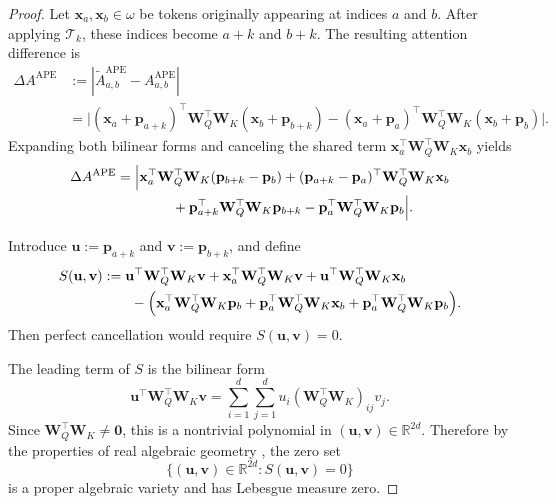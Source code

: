 \begin{proof}
Let $\mathbf{x}_a,\mathbf{x}_b \in \omega$ be tokens originally appearing at indices $a$ and $b$. After applying $\mathcal{T}_k$, these indices become $a+k$ and $b+k$. The resulting attention difference is
\begin{align}
\Delta A^{\mathrm{APE}}
&:=
\left|
\widetilde{A}_{a,b}^{\mathrm{APE}} - A_{a,b}^{\mathrm{APE}}
\right| \\
&=
\Big|
(\mathbf{x}_a+\mathbf{p}_{a+k})^\top \mathbf{W}_Q^\top \mathbf{W}_K (\mathbf{x}_b+\mathbf{p}_{b+k})
-
(\mathbf{x}_a+\mathbf{p}_a)^\top \mathbf{W}_Q^\top \mathbf{W}_K (\mathbf{x}_b+\mathbf{p}_b)
\Big|.
\end{align}
Expanding both bilinear forms and canceling the shared term $\mathbf{x}_a^\top \mathbf{W}_Q^\top \mathbf{W}_K \mathbf{x}_b$ yields
\begin{align}
\Delta A^{\mathrm{APE}}
&=
\Big|
\mathbf{x}_a^\top \mathbf{W}_Q^\top \mathbf{W}_K (\mathbf{p}_{b+k}-\mathbf{p}_b)
+
(\mathbf{p}_{a+k}-\mathbf{p}_a)^\top \mathbf{W}_Q^\top \mathbf{W}_K \mathbf{x}_b
\notag\\
&\qquad\qquad
+
\mathbf{p}_{a+k}^\top \mathbf{W}_Q^\top \mathbf{W}_K \mathbf{p}_{b+k}
-
\mathbf{p}_a^\top \mathbf{W}_Q^\top \mathbf{W}_K \mathbf{p}_b
\Big|.
\end{align}

Introduce $\mathbf{u} := \mathbf{p}_{a+k}$ and $\mathbf{v} := \mathbf{p}_{b+k}$, and define
\begin{align}
S(\mathbf{u},\mathbf{v})
&:=
\mathbf{u}^\top \mathbf{W}_Q^\top \mathbf{W}_K \mathbf{v}
+
\mathbf{x}_a^\top \mathbf{W}_Q^\top \mathbf{W}_K \mathbf{v}
+
\mathbf{u}^\top \mathbf{W}_Q^\top \mathbf{W}_K \mathbf{x}_b
\notag\\
&\qquad
-
\Big(
\mathbf{x}_a^\top \mathbf{W}_Q^\top \mathbf{W}_K \mathbf{p}_b
+
\mathbf{p}_a^\top \mathbf{W}_Q^\top \mathbf{W}_K \mathbf{x}_b
+
\mathbf{p}_a^\top \mathbf{W}_Q^\top \mathbf{W}_K \mathbf{p}_b
\Big).
\end{align}
Then perfect cancellation would require $S(\mathbf{u},\mathbf{v}) = 0$.

The leading term of $S$ is the bilinear form
\begin{equation}
\mathbf{u}^\top \mathbf{W}_Q^\top \mathbf{W}_K \mathbf{v}
=
\sum_{i=1}^d \sum_{j=1}^d
u_i (\mathbf{W}_Q^\top \mathbf{W}_K)_{ij} v_j.
\end{equation}
Since $\mathbf{W}_Q^\top \mathbf{W}_K \neq \mathbf{0}$, this is a nontrivial polynomial in $(\mathbf{u},\mathbf{v}) \in \mathbb{R}^{2d}$. Therefore by the properties of real algebraic geometry \citep{mityagin2020zeroset}, the zero set
\begin{equation}
\{(\mathbf{u},\mathbf{v}) \in \mathbb{R}^{2d} : S(\mathbf{u},\mathbf{v}) = 0\}
\end{equation}
is a proper algebraic variety and has Lebesgue measure zero.


\end{proof}
